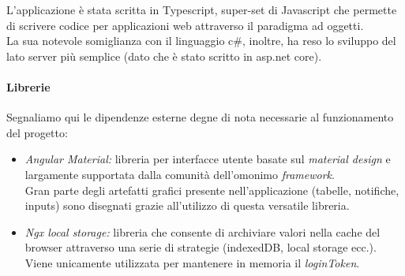 \documentclass[12pt]{article}
\begin{document}
L'applicazione è stata scritta in Typescript, super-set di Javascript che permette di scrivere codice per applicazioni web attraverso il paradigma ad oggetti.\\
La sua notevole somiglianza con il linguaggio c\#, inoltre, ha reso lo sviluppo del lato server più semplice (dato che è stato scritto in asp.net core).
\paragraph{Librerie}
Segnaliamo qui le dipendenze esterne degne di nota necessarie al funzionamento del progetto:
\begin{itemize}
\item \textit{Angular Material:} libreria per interfacce utente basate sul \textit{material design} e largamente supportata dalla comunità dell'omonimo \textit{framework}.\\
Gran parte degli artefatti grafici presente nell'applicazione (tabelle, notifiche, inputs) sono disegnati grazie all'utilizzo di questa versatile libreria.
\item \textit{Ngx local storage:} libreria che consente di archiviare valori nella cache del browser attraverso una serie di strategie (indexedDB, local storage ecc.).\\
Viene unicamente utilizzata per mantenere in memoria il \textit{loginToken}.
\end{itemize}
\end{document}
